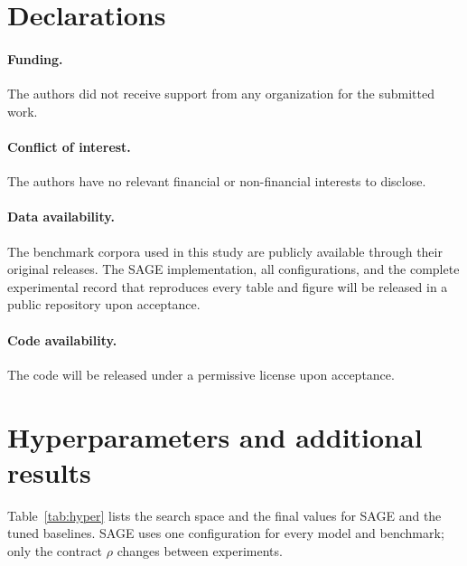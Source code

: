 \section*{Declarations}

\paragraph*{Funding.}
The authors did not receive support from any organization for the
submitted work.

\paragraph*{Conflict of interest.}
The authors have no relevant financial or non-financial interests to
disclose.

\paragraph*{Data availability.}
The benchmark corpora used in this study are publicly available
through their original releases. The SAGE implementation, all
configurations, and the complete experimental record that reproduces
every table and figure will be released in a public repository upon
acceptance.

\paragraph*{Code availability.}
The code will be released under a permissive license upon acceptance.

\appendix
\needspace{0.35\textheight}
\section{Hyperparameters and additional results}\label{app:hyper}

Table~\ref{tab:hyper} lists the search space and the final values for
SAGE and the tuned baselines. SAGE uses one configuration for every
model and benchmark; only the contract $\rho$ changes between
experiments.

